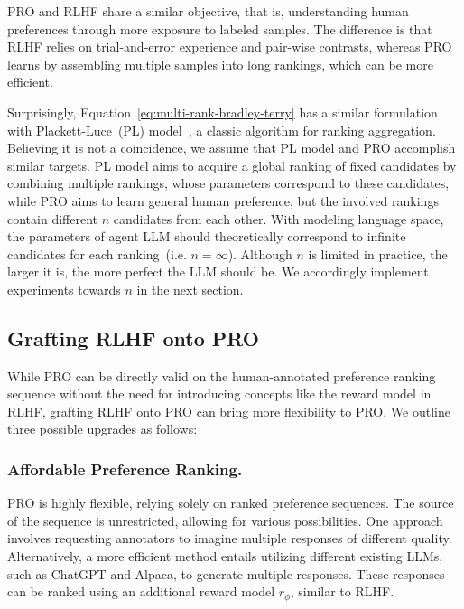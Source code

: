 PRO and RLHF share a similar objective, that is, understanding human preferences through more exposure to labeled samples. The difference is that RLHF relies on trial-and-error experience and pair-wise contrasts, whereas PRO learns by assembling multiple samples into long rankings, which can be more efficient. 

Surprisingly, Equation~\ref{eq:multi-rank-bradley-terry} has a similar formulation with Plackett-Luce~(PL) model~\cite{plackett1975analysis, luce2012individual}, a classic algorithm for ranking aggregation. Believing it is not a coincidence, we assume that PL model and PRO accomplish similar targets. PL model aims to acquire a global ranking of fixed candidates by combining multiple rankings, whose parameters correspond to these candidates, while PRO aims to learn general human preference, but the involved rankings contain different $n$ candidates from each other. With modeling language space, the parameters of agent LLM should theoretically correspond to infinite candidates for each ranking~(i.e. $n=\infty$). Although $n$ is limited in practice, the larger it is, the more perfect the LLM should be. We accordingly implement experiments towards $n$ in the next section.

\subsection{Grafting RLHF onto PRO} While PRO can be directly valid on the human-annotated preference ranking sequence without the need for introducing concepts like the reward model in RLHF, grafting RLHF onto PRO can bring more flexibility to PRO. We outline three possible upgrades as follows:
\subsubsection{Affordable Preference Ranking.} PRO is highly flexible, relying solely on ranked preference sequences. The source of the sequence is unrestricted, allowing for various possibilities. One approach involves requesting annotators to imagine multiple responses of different quality. Alternatively, a more efficient method entails utilizing different existing LLMs, such as ChatGPT and Alpaca, to generate multiple responses. These responses can be ranked using an additional reward model $r_{\phi}$, similar to RLHF. 

